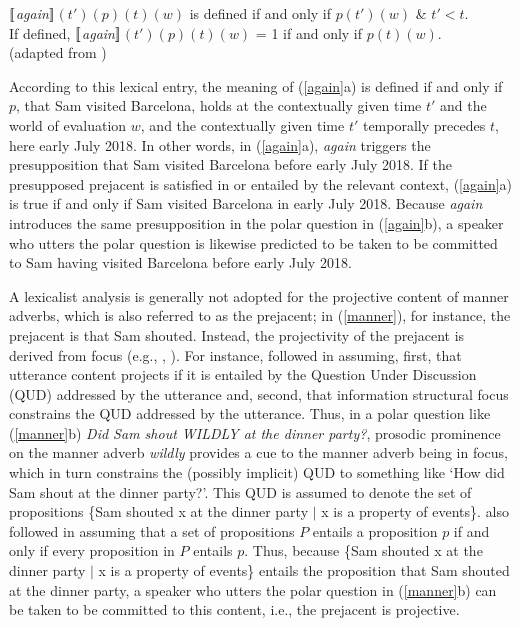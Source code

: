 \documentclass[a4paper,12pt]{article}
\newcommand{\6}{\mbox{$[\hspace*{-.6mm}[$}}
\newcommand{\9}{\mbox{$]\hspace*{-.6mm}]$}}
\newcommand{\mes}[1]{\6#1\9}
\begin{document}
\begin{exe}
\ex\label{beck} \mes{{\em again}}$(t')(p)(t)(w)$ is defined if and only if $p(t')(w)$ \& $t' < t$. \\ If defined, \mes{{\em again}}$(t')(p)(t)(w)$ = 1 if and only if $p(t)(w)$. \\ \hspace*{.2cm} \hfill (adapted from \citealt[286]{beck2006})
\end{exe}
According to this lexical entry, the meaning of (\ref{again}a) is defined if and only if $p$, that Sam visited Barcelona, holds at the contextually given time $t'$ and the world of evaluation $w$, and the contextually given time $t'$ temporally precedes $t$, here early July 2018. In other words, in (\ref{again}a), {\em again} triggers the presupposition that Sam visited Barcelona before early July 2018. If the presupposed prejacent is satisfied in or entailed by the relevant context, (\ref{again}a) is true if and only if Sam visited Barcelona in early July 2018. Because {\em again} introduces the same presupposition in the polar question in (\ref{again}b), a speaker who utters the polar question is likewise predicted to be taken to be committed to Sam having visited Barcelona before early July 2018. %

A lexicalist analysis is generally not adopted for the projective content of manner adverbs, which is also referred to as the prejacent; in (\ref{manner}), for instance, the prejacent is that Sam shouted. Instead, the projectivity of the prejacent is derived from focus (e.g., \citealt{abrusan2013}, \citealt*{stevens-etal2017}). For instance, \citet{stevens-etal2017} followed \citealt{best-question} in assuming, first, that utterance content projects if it is entailed by the Question Under Discussion (QUD) addressed by the utterance and, second, that information structural focus constrains the QUD addressed by the utterance. Thus, in a polar question like (\ref{manner}b) {\em Did Sam shout WILDLY at the dinner party?}, prosodic prominence on the manner adverb {\em wildly} provides a cue to the manner adverb being in focus, which in turn constrains the (possibly implicit) QUD to something like `How did Sam shout at the dinner party?'. This QUD is assumed to denote the set of  propositions \{Sam shouted x at the dinner party $|$ x is a property of events\}.  \citet{stevens-etal2017} also followed \citealt{best-question} in assuming that a set of propositions $P$ entails a proposition $p$ if and only if every proposition in $P$ entails $p$. Thus, because \{Sam shouted x at the dinner party $|$ x is a property of events\} entails the proposition that Sam shouted at the dinner party, a speaker who utters the polar question in (\ref{manner}b) can be taken to be committed to this content, i.e., the prejacent is projective. 
\end{document}
